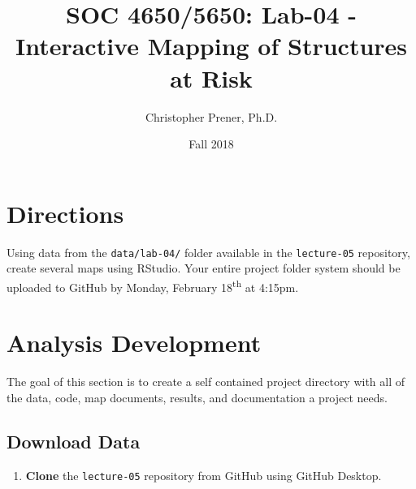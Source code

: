 \documentclass{tufte-handout}
\title{SOC 4650/5650: Lab-04 - Interactive Mapping of Structures at Risk}
\author{Christopher Prener, Ph.D.}
\date{Fall 2018}
\begin{document}
\maketitle %

\section{Directions}
Using data from the \texttt{data/lab-04/} folder available in the \texttt{lecture-05} repository, create several maps using RStudio. Your entire project folder system should be uploaded to GitHub by Monday, February 18\textsuperscript{th} at 4:15pm.

\vspace{5mm}
\section{Analysis Development}
The goal of this section is to create a self contained project directory with all of the data, code, map documents, results, and documentation a project needs.

\vspace{3mm}
\subsection{Download Data}
\begin{enumerate}[label=\alph*.]
\item \textbf{Clone} the \texttt{lecture-05} repository from GitHub using GitHub Desktop.
\end{enumerate}

\vspace{3mm}
\end{document}
